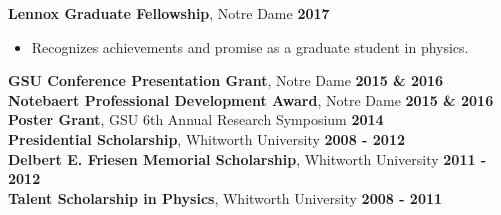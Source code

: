 \documentclass[margin]{res}
\begin{document}
\begin{resume}
{\bf Lennox Graduate Fellowship}, Notre Dame \hfill {\bf 2017}
\begin{itemize}  \itemsep -2pt %
     \item[] Recognizes achievements and promise as a graduate student in physics.
\end{itemize} \vspace{-12pt}
{\bf GSU Conference Presentation Grant}, Notre Dame  \hfill {\bf 2015 \& 2016}\\
{\bf Notebaert Professional Development Award}, Notre Dame \hfill {\bf 2015 \& 2016}\\
{\bf Poster Grant}, GSU 6th Annual Research Symposium \hfill {\bf 2014}\\
{\bf Presidential Scholarship}, Whitworth University \hfill {\bf2008 - 2012}\\
{\bf Delbert E. Friesen Memorial Scholarship}, Whitworth University \hfill {\bf2011 - 2012}\\
{\bf Talent Scholarship in Physics}, Whitworth University \hfill {\bf2008 - 2011}









\end{resume}
\end{document}
